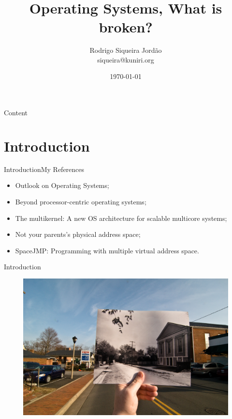 \documentclass[10pt]{beamer}
\title[] %
{ %
      \textbf{Operating Systems, What is broken?}
}
\subtitle[Operating Systems, What is broken?]
{
}
\author[Rodrigo Siqueira Jordão]
{      Rodrigo Siqueira Jordão \\
      {\ttfamily siqueira@kuniri.org}
}
\institute[]
{
      Institute of Mathematics and Statistics\\
      University of Sao Paulo\\
  
}
\date{\today}
\begin{document}

{\1%
\begin{frame} 
  \titlepage %
\end{frame}}

\begin{frame}[shrink]{Content}{}
  \tableofcontents
\end{frame}

\section{Introduction}
\begin{frame}{Introduction}{My References}

  \begin{itemize}
    \item Outlook on Operating Systems;
    \item Beyond processor-centric operating systems;
    \item The multikernel: A new OS architecture for scalable multicore systems;
    \item Not your parents's physical address space;
    \item SpaceJMP: Programming with multiple virtual address space.
  \end{itemize}
\end{frame}

\begin{frame}{Introduction}
  \begin{figure}[ht]
    \vspace{5pt}
    \centering
    \includegraphics[width=1\textwidth, keepaspectratio=true]{images/designwontchange.jpg}
  \end{figure}
\end{frame}
\end{document}
